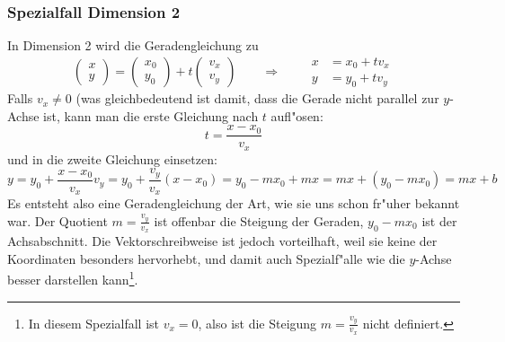 \subsubsection{Spezialfall Dimension 2}
In Dimension 2 wird die Geradengleichung zu
\[
\begin{pmatrix}
x\\y
\end{pmatrix}
=
\begin{pmatrix}
x_0\\y_0
\end{pmatrix}
+t
\begin{pmatrix}
v_x\\v_y
\end{pmatrix}
\qquad
\Rightarrow
\qquad
\begin{aligned}
x&=x_0+tv_x\\
y&=y_0+tv_y
\end{aligned}
\]
Falls $v_x\ne 0$ (was gleichbedeutend ist damit, dass die Gerade
nicht parallel zur $y$-Achse ist, kann man die erste Gleichung nach
$t$ aufl"osen:
\[
t = \frac{x-x_0}{v_x}
\]
und in die zweite Gleichung einsetzen:
\[
y=y_0+
\frac{x-x_0}{v_x}v_y
=
y_0+\frac{v_y}{v_x}(x-x_0)
=
y_0-mx_0 +mx
=
mx+(y_0-mx_0)=mx+b
\]
Es entsteht also eine Geradengleichung der Art, wie sie uns schon fr"uher
bekannt war. Der Quotient
$m=\frac{v_y}{v_x}$
ist offenbar die Steigung der Geraden, $y_0-mx_0$ ist der Achsabschnitt.
Die Vektorschreibweise ist jedoch vorteilhaft, weil sie keine der
Koordinaten besonders hervorhebt, und damit auch Spezialf"alle wie
die $y$-Achse besser darstellen kann\footnote{In diesem Spezialfall ist
$v_x=0$, also ist die Steigung $m=\frac{v_y}{v_x}$ nicht definiert.}.

